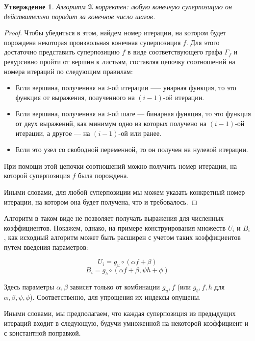 \documentclass[12pt,a4paper]{amsart}
\newtheorem{stat}{Утверждение}
\begin{document}
\begin{stat}
  Алгоритм $\mathfrak{A}$ корректен: любую конечную суперпозицию он
  действительно породит за конечное число шагов.
\end{stat}
\begin{proof}
  Чтобы убедиться в этом, найдем номер итерации, на котором будет порождена
  некоторая произвольная конечная суперпозиция $f$. Для этого достаточно
  представить суперпозицию $f$ в виде соответствующего графа $\Gamma_f$
  и рекурсивно пройти от вершин к листьям, составляя цепочку соотношений
  на номера итераций по следующим правилам:

  \begin{itemize}
	\item Если вершина, полученная на $i$-ой итерации —-- унарная функция,
	  то это функция от выражения, полученного на $(i-1)$-ой итерации.
	\item Если вершина, полученная на $i$-ой шаге --- бинарная функция, то
	  это функция от двух выражений, как минимум одно из которых получено
	  на $(i-1)$-ой итерации, а другое --- на $(i-1)$-ой или ранее.
	\item Если это узел со свободной переменной, то он получен на нулевой
	  итерации.
  \end{itemize}

  При помощи этой цепочки соотношений можно получить номер итерации, на
  которой суперпозиция $f$ была порождена.
  
  Иными словами, для любой суперпозиции мы можем указать конкретный номер
  итерации, на котором она будет получена, что и требовалось.
\end{proof}

Алгоритм в таком виде не позволяет получать выражения для численных
коэффициентов. Покажем, однако, на примере конструирования множеств
$U_i$ и $B_i$, как исходный алгоритм может быть расширен с учетом
таких коэффициентов путем введения параметров:

\[
U_i = { g_u \circ (\alpha f + \beta) }
\]
\[
B_i = { g_b \circ (\alpha f + \beta, \psi h + \phi) }
\]

Здесь параметры $\alpha, \beta$ зависят только от комбинации $g_u, f$ (или
$g_b, f, h$ для $\alpha, \beta, \psi, \phi$). Соответственно, для упрощения
их индексы опущены.

Иными словами, мы предполагаем, что каждая суперпозиция из предыдущих итераций
входит в следующую, будучи умноженной на некоторой коэффициент и с константной
поправкой.
\end{document}
